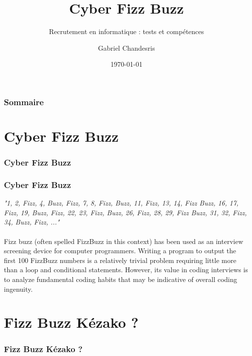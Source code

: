 \documentclass{beamer}
\title{Cyber Fizz Buzz}
\subtitle{Recrutement en informatique : tests et comp{\'e}tences}
\author{Gabriel Chandesris}
\institute{\emph{to be defined}}
\date{\today} %
\begin{document}
\frame[plain]{\titlepage } 
%


\begin{frame}
	\frametitle{Sommaire}
	\small \tableofcontents[hideallsubsections]
\end{frame} 

\section{Cyber Fizz Buzz}
\begin{frame}
	\frametitle{Cyber Fizz Buzz}
	\tableofcontents[sections=1,currentsection,subsectionstyle=show/shaded/hide] %
\end{frame} 

\begin{frame}
	\frametitle{Cyber Fizz Buzz}
	
	\emph{"1, 2, Fizz, 4, Buzz, Fizz, 7, 8, Fizz, Buzz, 11, Fizz, 13, 14, Fizz Buzz, 16, 17, Fizz, 19, Buzz, Fizz, 22, 23, Fizz, Buzz, 26, Fizz, 28, 29, Fizz Buzz, 31, 32, Fizz, 34, Buzz, Fizz, ..."}~\\~\\
	
	
	Fizz buzz (often spelled FizzBuzz in this context) has been used as an interview screening device for computer programmers. Writing a program to output the first 100 FizzBuzz numbers is a relatively trivial problem requiring little more than a loop and conditional statements. However, its value in coding interviews is to analyze fundamental coding habits that may be indicative of overall coding ingenuity.

\end{frame} 

\section{Fizz Buzz K{\'e}zako ?}
\begin{frame}
	\frametitle{Fizz Buzz K{\'e}zako ?}
	\tableofcontents[sections=2,currentsection,subsectionstyle=show/shaded/hide]
\end{frame} 

\def\titleTentativeDefinitionCyberFizzBuzz{Cyber Fizz Buzz : tentative de d{\'e}finition}
\end{document}
